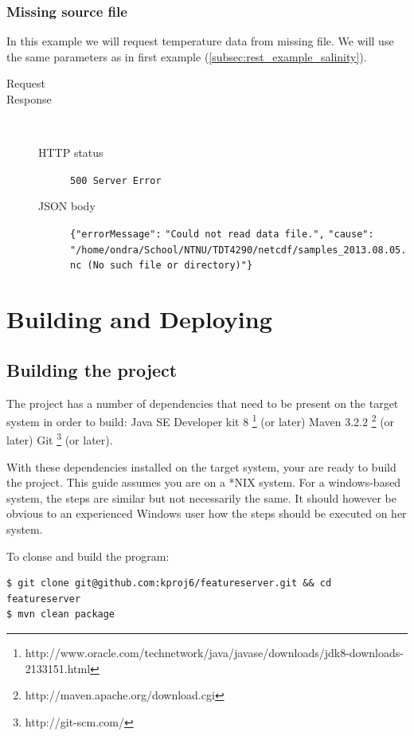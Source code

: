\documentclass[11pt,a4paper,titlepage,oneside]{report}
\begin{document}
\subsection{Missing source file}
In this example we will request temperature data from missing file. We will use the same parameters as in first example (\ref{subsec:rest_example_salinity}).

\begin{description}
	\item[Request] 
	\item[Response] ~\\
		\begin{description}
			\item[\gls{HTTP} status] \texttt{500 Server Error}
			\item[\gls{JSON} body] \texttt{\{"errorMessage":} \texttt{"Could not read data file.",} \texttt{"cause":} \texttt{"/home/ondra/School/NTNU/TDT4290/netcdf/samples\_2013.08.05.nc (No such file or directory)"\}}
		\end{description}
\end{description}

\chapter{Building and Deploying}
\section{Building the project}
The project has a number of dependencies that need to be present on the target system in order to build:
Java SE Developer kit 8 \footnote{http://www.oracle.com/technetwork/java/javase/downloads/jdk8-downloads-2133151.html} (or later)
Maven 3.2.2 \footnote{http://maven.apache.org/download.cgi} (or later)
Git \footnote{http://git-scm.com/} (or later).

With these dependencies installed on the target system, your are ready to build the project.
This guide assumes you are on a *NIX system. For a windows-based system, the steps are similar but not necessarily the same. It should however be obvious to an experienced Windows user how the steps should be executed on her system.

To clonse and build the program:
\begin{lstlisting}
$ git clone git@github.com:kproj6/featureserver.git && cd featureserver
$ mvn clean package
\end{lstlisting}
\end{document}

